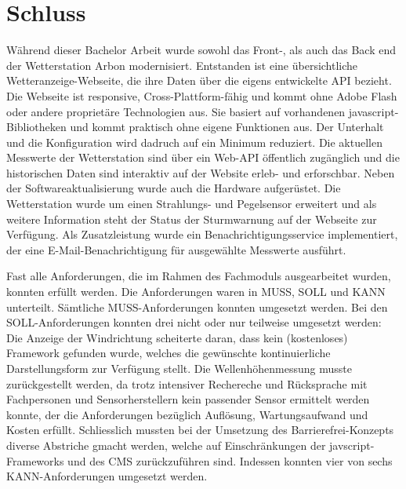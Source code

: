 \section*{Schluss}



Während dieser Bachelor Arbeit wurde sowohl das Front-, als auch das Back end der Wetterstation Arbon modernisiert. Entstanden ist eine übersichtliche Wetteranzeige-Webseite, die ihre Daten über die eigens entwickelte API bezieht. Die Webseite ist responsive, Cross-Plattform-fähig und kommt ohne Adobe Flash oder andere proprietäre Technologien aus. Sie basiert auf vorhandenen javascript-Bibliotheken und kommt praktisch ohne eigene Funktionen aus. Der Unterhalt und die Konfiguration wird dadruch auf ein Minimum reduziert. Die aktuellen Messwerte der Wetterstation sind über ein Web-API öffentlich zugänglich und die historischen Daten sind interaktiv auf der Website erleb- und erforschbar. Neben der Softwareaktualisierung wurde auch die Hardware aufgerüstet. Die Wetterstation wurde um einen Strahlungs- und Pegelsensor erweitert und als weitere Information steht der Status der Sturmwarnung auf der Webseite zur Verfügung. Als Zusatzleistung wurde ein Benachrichtigungsservice implementiert, der eine E-Mail-Benachrichtigung für ausgewählte Messwerte ausführt.
\newline



Fast alle Anforderungen, die im Rahmen des Fachmoduls ausgearbeitet wurden, konnten erfüllt werden. Die Anforderungen waren in MUSS, SOLL und KANN unterteilt. Sämtliche MUSS-Anforderungen konnten umgesetzt werden. Bei den SOLL-Anforderungen konnten drei nicht oder nur teilweise umgesetzt werden: Die Anzeige der Windrichtung scheiterte daran, dass kein (kostenloses) Framework gefunden wurde, welches die gewünschte kontinuierliche Darstellungsform zur Verfügung stellt. Die Wellenhöhenmessung musste zurückgestellt werden, da trotz intensiver Rechereche und Rücksprache mit Fachpersonen und Sensorherstellern kein passender
Sensor ermittelt werden konnte, der die Anforderungen bezüglich Auflösung, Wartungsaufwand und Kosten erfüllt. Schliesslich mussten bei der Umsetzung des Barrierefrei-Konzepts diverse Abstriche gmacht werden, welche auf Einschränkungen der javscript-Frameworks und des CMS zurückzuführen sind. Indessen konnten vier von sechs KANN-Anforderungen umgesetzt werden.
\newline

